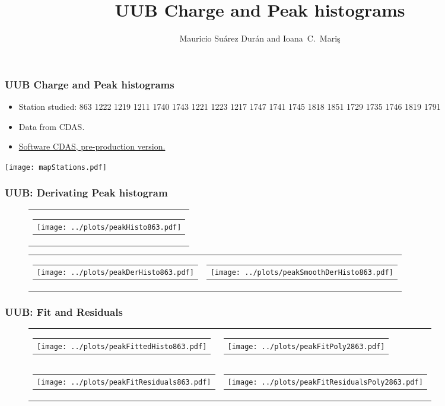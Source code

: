 \documentclass[aspectratio=169]{beamer}
\title{UUB Charge and Peak histograms}
\author{
  Mauricio Su\'arez Dur\'an and Ioana~C.~Mari\c{s}
}
\institute{IIHE-ULB}
\begin{document}
\begin{frame}
  \titlepage
\end{frame}


\begin{frame}
	\frametitle{UUB Charge and Peak histograms}
	\begin{itemize}
		\item Station studied: 863 1222 1219 1211 1740 1743 1221 1223 1217 1747 1741 1745 1818 1851 1729 1735 1746 1819 1791
		\item Data from CDAS.
		\item {\underline {Software CDAS, pre-production version.}}
	\end{itemize}
	\centering
	\texttt{[image: mapStations.pdf]}
\end{frame}


\begin{frame}
  \frametitle{UUB: Derivating Peak histogram} %
  \begin{figure}
    \centering
    \begin{tabularx}{\textwidth}{C}
      \begin{tabular}{l}
        \texttt{[image: ../plots/peakHisto863.pdf]}
      \end{tabular}
    \end{tabularx}

    \begin{tabularx}{\textwidth}{CC}
      \begin{tabular}{l}
        \texttt{[image: ../plots/peakDerHisto863.pdf]}
      \end{tabular}
      &
      \begin{tabular}{l}
        \texttt{[image: ../plots/peakSmoothDerHisto863.pdf]}
      \end{tabular}
    \end{tabularx}
  \end{figure}
\end{frame}


\begin{frame}
  \frametitle{UUB: Fit and Residuals}
  \begin{figure}
    \centering
    \begin{tabularx}{\textwidth}{CC}
      \begin{tabular}{l}
        \texttt{[image: ../plots/peakFittedHisto863.pdf]}
      \end{tabular}
      &
      \begin{tabular}{l}
        \texttt{[image: ../plots/peakFitPoly2863.pdf]}
      \end{tabular}
      \\
      \begin{tabular}{l}
        \texttt{[image: ../plots/peakFitResiduals863.pdf]}
      \end{tabular}
      &
      \begin{tabular}{l}
        \texttt{[image: ../plots/peakFitResidualsPoly2863.pdf]}
      \end{tabular}
    \end{tabularx}
  \end{figure}
\end{frame}
\end{document}
